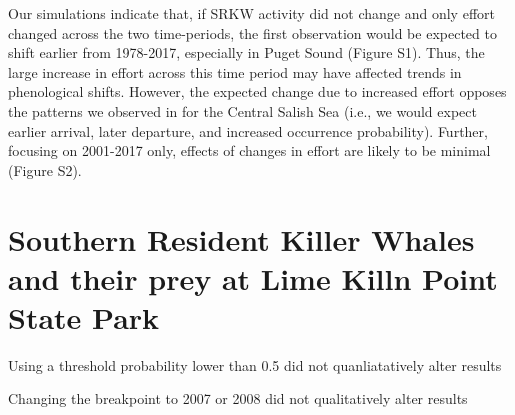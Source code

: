 \documentclass{article}
\begin{document}
\par Our simulations indicate that, if SRKW activity did not change and only effort changed across the two time-periods, the first observation would be expected to shift earlier from 1978-2017, especially in Puget Sound (Figure S1). Thus, the large increase in effort across this time period may have affected trends in phenological shifts.  However, the expected change due to increased effort opposes the patterns we observed in for the Central Salish Sea (i.e., we would expect earlier arrival, later departure, and increased occurrence probability). Further, focusing on 2001-2017 only, effects of changes in effort are likely to be minimal (Figure S2).

\section* {Southern Resident Killer Whales and their prey at Lime Killn Point State Park}
\par Using a threshold probability lower than 0.5 did not quanliatatively alter results
\par Changing the breakpoint to 2007 or 2008 did not qualitatively alter results 
\end{document}
